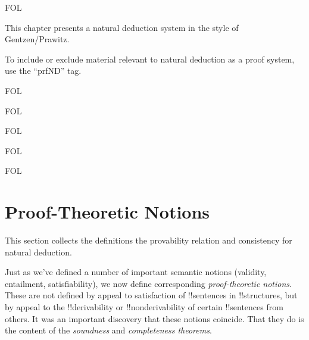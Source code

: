 \documentclass[10pt,a4paper]{article}
\theoremstyle{plain}
\theoremstyle{definition}
\theoremstyle{remark}
\newenvironment{explain}{}{}
\newenvironment{editorial}{}{}
\newcommand*{\olfileid}[3]{}
\newcommand*{\olsection}[1]{\section*{#1}}
\newcommand*{\olchapter}[3]{}
\newcommand*{\olimport}[1]{}
\providecommand{\iftag}[1]{#1}
\begin{document}



\iftag{FOL}
      {\olchapter{fol}{ntd}{Natural Deduction}}
      {\olchapter{pl}{ntd}{Natural Deduction}}

\begin{editorial}
This chapter presents a natural deduction system in the style of
Gentzen/Prawitz.
  
To include or exclude material relevant to natural deduction as a
proof system, use the ``prfND'' tag.
\end{editorial}

\olimport{rules-and-proofs}

\olimport{propositional-rules}

\iftag{FOL}{%
  \olimport{quantifier-rules}
}{}

\olimport{derivations}

\olimport{proving-things}

\iftag{FOL}{%
  \olimport{proving-things-quant}
}{}

\olimport{proof-theoretic-notions}

\olimport{provability-consistency}

\olimport{provability-propositional}

\iftag{FOL}{%
  \olimport{provability-quantifiers}
}{}

\olimport{soundness}

\iftag{FOL}{%
  \olimport{identity}
  \olimport{soundness-identity}
}{}

\OLEndChapterHook





\iftag{FOL}
      {\olfileid{fol}{ntd}{ptn}}
      {\olfileid{pl}{ntd}{ptn}}

\olsection{Proof-Theoretic Notions}

\begin{editorial}
This section collects the definitions the provability relation
and consistency for natural deduction.
\end{editorial}

\begin{explain}
Just as we've defined a number of important semantic notions
(validity, entailment, satisfiability), we now define corresponding
\emph{proof-theoretic notions}.  These are not defined by appeal to
satisfaction of !!{sentence}s in !!{structure}s, but by appeal to the
!!{derivability} or !!{nonderivability} of certain !!{sentence}s from
others.  It was an important discovery that these notions coincide.
That they do is the content of the \emph{soundness} and
\emph{completeness theorems}.
\end{explain}
\end{document}
